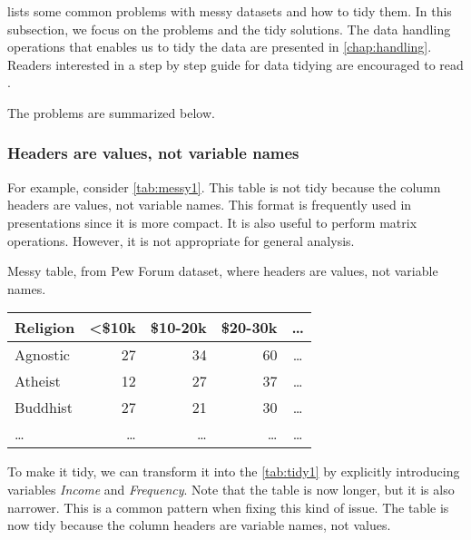 \textcite{Wickham2014} lists some common problems with messy
datasets and how to tidy them.  In this subsection, we focus on the problems and the
tidy solutions.  The data handling operations that enables us to tidy the data are
presented in \cref{chap:handling}.  Readers interested in a step by step guide for data
tidying are encouraged to read \textcite{Wickham2023}.

The problems are summarized below.

\clearpage
\subsubsection{Headers are values, not variable names}  For example, consider
\cref{tab:messy1}.  This table is not tidy because the column headers are values, not
variable names.  This format is frequently used in presentations since it is more compact.
It is also useful to perform matrix operations. However, it is not appropriate for general
analysis.

\begin{tablebox}[label=tab:messy1]{Messy table, from Pew Forum dataset, where headers are values, not variable names.}
  \centering
  \begin{tabular}{l r r r c}
    \toprule
    Religion & <\$10k & \$10-20k & \$20-30k & \dots \\
    \midrule
    Agnostic & 27 & 34 & 60 & \dots \\
    Atheist & 12 & 27 & 37 & \dots \\
    Buddhist & 27 & 21 & 30 & \dots \\
    \dots & \dots & \dots & \dots & \dots \\
    \bottomrule
  \end{tabular}
\end{tablebox}

To make it tidy, we can transform it into the \cref{tab:tidy1} by explicitly introducing
variables \emph{Income} and \emph{Frequency}.
Note that the table is now longer, but it is also narrower.  This is a common pattern when
fixing this kind of issue.  The table is now tidy because the column headers are variable
names, not values.

